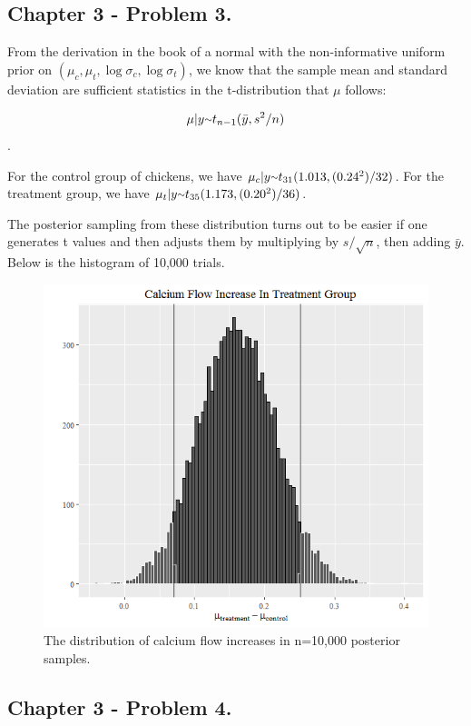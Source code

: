 \documentclass{article}
\newcommand{\mytilde}{\raise.17ex\hbox{$\scriptstyle\mathtt{\sim}$}}
\begin{document}
\subsection{Chapter 3 - Problem 3.}

From the derivation in the book of a normal with the non-informative uniform prior 
on \( (\mu_c, \mu_t, \log \sigma_c, \log \sigma_t)\), we know that the sample mean and standard
deviation are sufficient statistics in the t-distribution that \(\mu\) follows:

\[ \mu \vert y \mytilde t_{n-1}(\bar{y}, s^2/n)\]. 

For the control group of chickens, we have
\( \mu_c \vert y \mytilde t_{31}(1.013, (0.24^2)/32)\). For the treatment group, we have
\( \mu_t \vert y \mytilde t_{35}(1.173, (0.20^2)/36)\).

The posterior sampling from these distribution turns out to be easier if one generates t values
and then adjusts them by multiplying by \(s / \sqrt{n}\), then adding \(\bar{y}\). Below is the histogram of 10,000 trials.

\begin{figure}[!ht]
  \caption{The distribution of calcium flow increases in n=10,000 posterior samples.}
  \centering
    \includegraphics[width=\textwidth]{HW3--Problem33}
\end{figure}


\subsection{Chapter 3 - Problem 4.}
\end{document}
